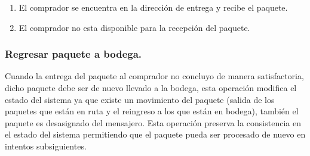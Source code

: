 \documentclass[12pt,a4paper,zed]{article}
\begin{document}
\begin{enumerate}
\item El comprador se encuentra en la dirección de entrega y recibe el paquete.


\item El comprador no esta disponible para la recepción del paquete.


\end{enumerate}

\subsubsection{Regresar paquete a bodega.}
Cuando la entrega del paquete al comprador no concluyo de manera satisfactoria, dicho paquete debe ser de nuevo llevado a la bodega, esta operación modifica el estado del sistema ya que existe un movimiento del paquete (salida de los paquetes que están en ruta y el reingreso a los que están en bodega), también el paquete es desasignado del mensajero. Esta operación preserva la consistencia en el estado del sistema permitiendo que el paquete pueda ser procesado de nuevo en intentos subsiguientes.
\end{document}
